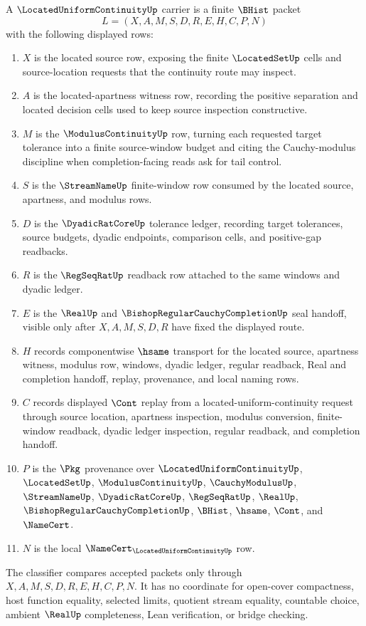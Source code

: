 \begin{definition}
\label{def:located-uniform-continuity-carrier}
A $\LocatedUniformContinuityUp$ carrier is a finite $\BHist$ packet
$$
L=(X,A,M,S,D,R,E,H,C,P,N)
$$
with the following displayed rows:
\begin{enumerate}
\item $X$ is the located source row, exposing the finite $\LocatedSetUp$ cells and source-location requests that the continuity route may inspect.
\item $A$ is the located-apartness witness row, recording the positive separation and located decision cells used to keep source inspection constructive.
\item $M$ is the $\ModulusContinuityUp$ row, turning each requested target tolerance into a finite source-window budget and citing the Cauchy-modulus discipline when completion-facing reads ask for tail control.
\item $S$ is the $\StreamNameUp$ finite-window row consumed by the located source, apartness, and modulus rows.
\item $D$ is the $\DyadicRatCoreUp$ tolerance ledger, recording target tolerances, source budgets, dyadic endpoints, comparison cells, and positive-gap readbacks.
\item $R$ is the $\RegSeqRatUp$ readback row attached to the same windows and dyadic ledger.
\item $E$ is the $\RealUp$ and $\BishopRegularCauchyCompletionUp$ seal handoff, visible only after $X,A,M,S,D,R$ have fixed the displayed route.
\item $H$ records componentwise $\hsame$ transport for the located source, apartness witness, modulus row, windows, dyadic ledger, regular readback, Real and completion handoff, replay, provenance, and local naming rows.
\item $C$ records displayed $\Cont$ replay from a located-uniform-continuity request through source location, apartness inspection, modulus conversion, finite-window readback, dyadic ledger inspection, regular readback, and completion handoff.
\item $P$ is the $\Pkg$ provenance over $\LocatedUniformContinuityUp$, $\LocatedSetUp$, $\ModulusContinuityUp$, $\CauchyModulusUp$, $\StreamNameUp$, $\DyadicRatCoreUp$, $\RegSeqRatUp$, $\RealUp$, $\BishopRegularCauchyCompletionUp$, $\BHist$, $\hsame$, $\Cont$, and $\NameCert$.
\item $N$ is the local $\NameCert_{\LocatedUniformContinuityUp}$ row.
\end{enumerate}
The classifier compares accepted packets only through $X,A,M,S,D,R,E,H,C,P,N$. It has no coordinate for open-cover compactness, host function equality, selected limits, quotient stream equality, countable choice, ambient $\RealUp$ completeness, Lean verification, or bridge checking.
\end{definition}

